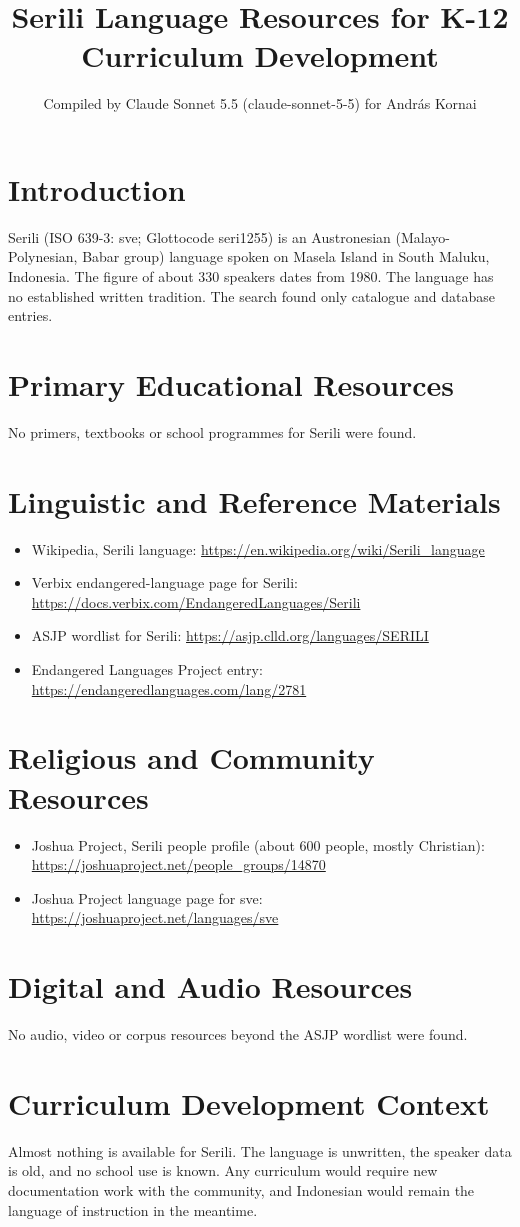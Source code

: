 \documentclass[12pt]{article}
\title{Serili Language Resources for K-12 Curriculum Development}
\author{Compiled by Claude Sonnet 5.5 (claude-sonnet-5-5) for Andr\'as Kornai}
\date{}
\begin{document}
\maketitle

\section{Introduction}
Serili (ISO 639-3: sve; Glottocode seri1255) is an Austronesian (Malayo-Polynesian, Babar group) language spoken on Masela Island in South Maluku, Indonesia. The figure of about 330 speakers dates from 1980. The language has no established written tradition. The search found only catalogue and database entries.

\section{Primary Educational Resources}
No primers, textbooks or school programmes for Serili were found.

\section{Linguistic and Reference Materials}
\begin{itemize}
\item Wikipedia, Serili language: \url{https://en.wikipedia.org/wiki/Serili_language}
\item Verbix endangered-language page for Serili: \url{https://docs.verbix.com/EndangeredLanguages/Serili}
\item ASJP wordlist for Serili: \url{https://asjp.clld.org/languages/SERILI}
\item Endangered Languages Project entry: \url{https://endangeredlanguages.com/lang/2781}
\end{itemize}

\section{Religious and Community Resources}
\begin{itemize}
\item Joshua Project, Serili people profile (about 600 people, mostly Christian): \url{https://joshuaproject.net/people_groups/14870}
\item Joshua Project language page for sve: \url{https://joshuaproject.net/languages/sve}
\end{itemize}

\section{Digital and Audio Resources}
No audio, video or corpus resources beyond the ASJP wordlist were found.

\section{Curriculum Development Context}
Almost nothing is available for Serili. The language is unwritten, the speaker data is old, and no school use is known. Any curriculum would require new documentation work with the community, and Indonesian would remain the language of instruction in the meantime.
\end{document}
